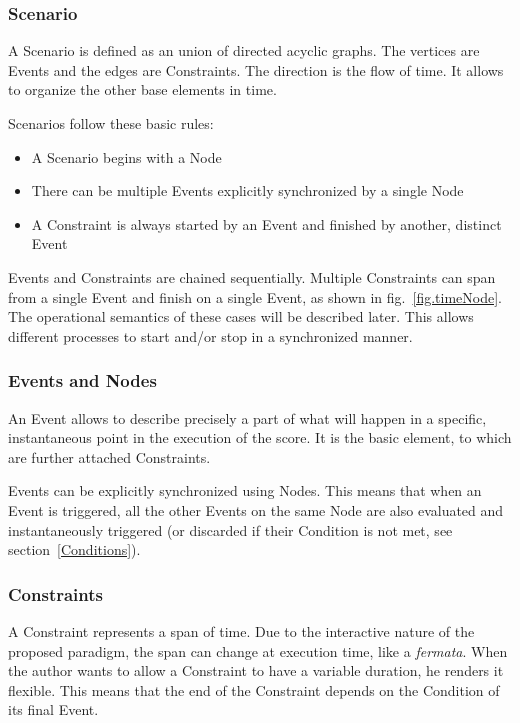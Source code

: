 \documentclass{article}
\begin{document}
    \subsubsection{Scenario}
    A Scenario is defined as an union of directed acyclic graphs. The vertices are Events and the edges are Constraints. The direction is the flow of time. It allows to organize the other base elements in time. 
    
	Scenarios follow these basic rules:
	\begin{itemize}
		\item A Scenario begins with a Node
		\item There can be multiple Events explicitly synchronized by a single Node
		\item A Constraint is always started by an Event and finished by another, distinct Event
	\end{itemize}
	
	Events and Constraints are chained sequentially. Multiple Constraints can span from a single Event and finish on a single Event, as shown in fig.~\ref{fig.timeNode}. The operational semantics of these cases will be described later. This allows different processes to start and/or stop in a synchronized manner.

	\subsubsection{Events and Nodes}\label{section.events}
	An Event allows to describe precisely a part of what will happen in a specific, instantaneous point in the execution of the score.
	It is the basic element, to which are further attached Constraints.
	
	Events can be explicitly synchronized using Nodes.
    This means that when an Event is triggered, all the other Events on the same Node are also evaluated and instantaneously triggered (or discarded if their Condition is not met, see section~\ref{Conditions}).
    
	\subsubsection{Constraints}
	A Constraint represents a span of time. Due to the interactive nature of the proposed paradigm, the span can change at execution time, like a \textit{fermata}. When the author wants to allow a Constraint to have a variable duration, he renders it flexible. This means that the end of the Constraint depends on the Condition of its final Event.
	
\end{document}
